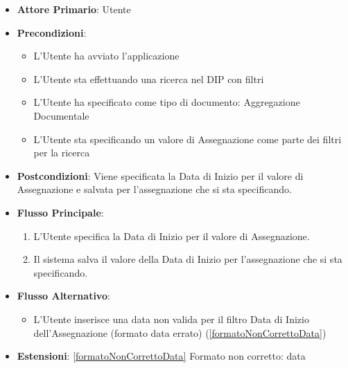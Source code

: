 \begin{itemize}
      \item \textbf{Attore Primario}: Utente
      \item \textbf{Precondizioni}: 
      \begin{itemize}
            \item L'Utente ha avviato l'applicazione
            \item L'Utente sta effettuando una ricerca nel DIP con filtri
            \item L'Utente ha specificato come tipo di documento: Aggregazione Documentale
            \item L'Utente sta specificando un valore di Assegnazione come parte dei filtri per la ricerca
      \end{itemize}
      \item \textbf{Postcondizioni}: Viene specificata la Data di Inizio per il valore di Assegnazione e salvata per l'assegnazione che si sta specificando.
      \item \textbf{Flusso Principale}:
      \begin{enumerate}
            \item L'Utente specifica la Data di Inizio per il valore di Assegnazione.
            \item Il sistema salva il valore della Data di Inizio per l'assegnazione che si sta specificando.
      \end{enumerate}
      \item \textbf{Flusso Alternativo}:
      \begin{itemize}
            \item L'Utente inserisce una data non valida per il filtro Data di Inizio dell'Assegnazione (formato data errato) (\ref{formatoNonCorrettoData})
      \end{itemize}
      \item \textbf{Estensioni}: \ref{formatoNonCorrettoData} Formato non corretto: data
\end{itemize}

